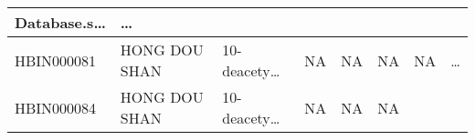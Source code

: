 \documentclass[
]{article}
\begin{document}
\begin{longtable}[]{@{}llllllll@{}}
\begin{minipage}[b]{0.11\columnwidth}
Database.s\ldots{}\strut
\end{minipage} & \begin{minipage}[b]{0.03\columnwidth}\raggedright
\ldots{}\strut
\end{minipage}\tabularnewline
\midrule
\endhead
\begin{minipage}[t]{0.11\columnwidth}\raggedright
HBIN000081\strut
\end{minipage} & \begin{minipage}[t]{0.11\columnwidth}\raggedright
HONG DOU SHAN\strut
\end{minipage} & \begin{minipage}[t]{0.14\columnwidth}\raggedright
10-deacety\ldots{}\strut
\end{minipage} & \begin{minipage}[t]{0.14\columnwidth}\raggedright
NA\strut
\end{minipage} & \begin{minipage}[t]{0.08\columnwidth}\raggedright
NA\strut
\end{minipage} & \begin{minipage}[t]{0.09\columnwidth}\raggedright
NA\strut
\end{minipage} & \begin{minipage}[t]{0.11\columnwidth}\raggedright
NA\strut
\end{minipage} & \begin{minipage}[t]{0.03\columnwidth}\raggedright
\ldots{}\strut
\end{minipage}\tabularnewline
\begin{minipage}[t]{0.11\columnwidth}\raggedright
HBIN000084\strut
\end{minipage} & \begin{minipage}[t]{0.11\columnwidth}\raggedright
HONG DOU SHAN\strut
\end{minipage} & \begin{minipage}[t]{0.14\columnwidth}\raggedright
10-deacety\ldots{}\strut
\end{minipage} & \begin{minipage}[t]{0.14\columnwidth}\raggedright
NA\strut
\end{minipage} & \begin{minipage}[t]{0.08\columnwidth}\raggedright
NA\strut
\end{minipage} & \begin{minipage}[t]{0.09\columnwidth}\raggedright
NA\strut
\end{minipage} & \begin{minipage}[t]{0.11\columnwidth}\raggedright

\end{minipage}
\end{longtable}
\end{document}
